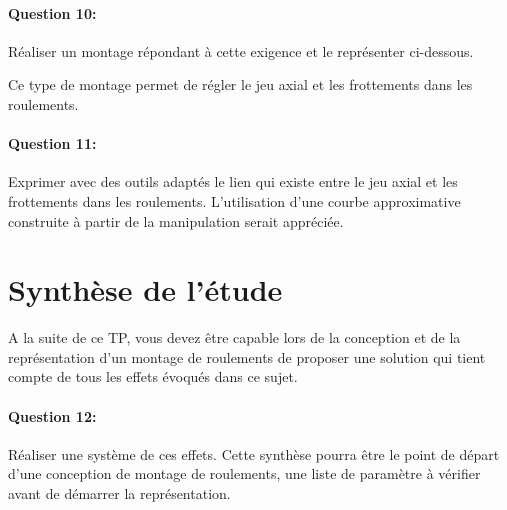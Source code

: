 \paragraph{Question 10:} Réaliser un montage répondant à cette exigence et le représenter ci-dessous.

Ce type de montage permet de régler le jeu axial et les frottements dans les roulements.

\paragraph{Question 11:} Exprimer avec des outils adaptés le lien qui existe entre le jeu axial et les frottements dans les roulements. L'utilisation d'une courbe approximative construite à partir de la manipulation serait appréciée.

\section{Synthèse de l'étude}

A la suite de ce TP, vous devez être capable lors de la conception et de la représentation d'un montage de roulements de proposer une solution qui tient compte de tous les effets évoqués dans ce sujet.

\paragraph{Question 12:} Réaliser une système de ces effets. Cette synthèse pourra être le point de départ d'une conception de montage de roulements, une liste de paramètre à vérifier avant de démarrer la représentation.


